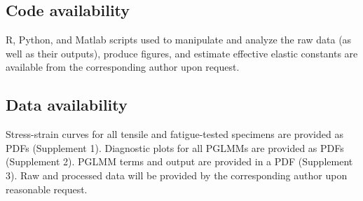 \documentclass[twocolumn, linenumbers, superscriptaddress, nofootinbib]{revtex4-1}
\begin{document}
		\subsection*{Code availability}
			R, Python, and Matlab scripts used to manipulate and analyze the raw data (as well as their outputs), produce figures, and estimate effective elastic constants are available from the corresponding author upon request.
			
		\subsection*{Data availability}
			Stress-strain curves for all tensile and fatigue-tested specimens are provided as PDFs (Supplement 1).
			Diagnostic plots for all PGLMMs are provided as PDFs (Supplement 2). PGLMM terms and output are provided in a PDF (Supplement 3). Raw and processed data will be provided by the corresponding author upon reasonable request.
\end{document}
